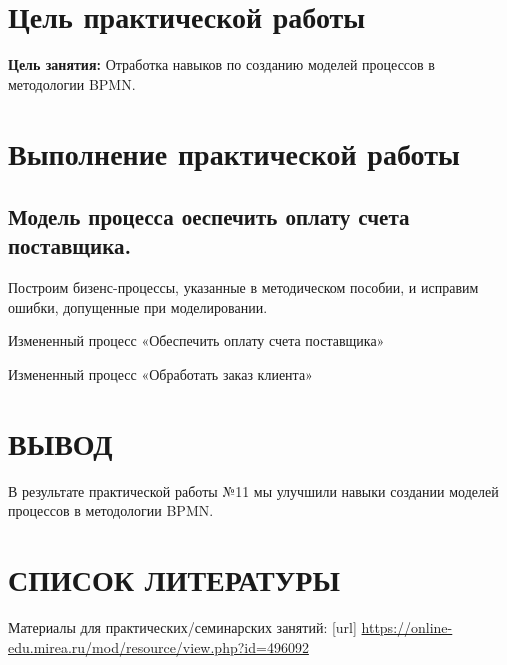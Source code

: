 \graphicspath{{./img/}}

\section{Цель практической работы}
\textbf{Цель занятия:}
Отработка навыков по созданию моделей процессов в методологии BPMN.

\clearpage

\section{Выполнение практической работы}
\subsection{Модель процесса оеспечить оплату счета поставщика.}
Построим бизенс-процессы, указанные в методическом пособии, и исправим ошибки, допущенные при моделировании.


\begin{image}
	\caption{Измененный процесс «Обеспечить оплату счета поставщика»}
\end{image}

\clearpage
\newpage

\begin{image}
	\caption{Измененный процесс «Обработать заказ клиента»}
\end{image}

\clearpage
\newpage

\section*{ВЫВОД}
В результате практической работы №11 мы улучшили навыки создании моделей процессов в методологии BPMN.

\clearpage

\section*{СПИСОК ЛИТЕРАТУРЫ}
\begin{thebibliography}{}
	\bibitem{}  Материалы для практических/семинарских занятий: [url]
	\url{https://online-edu.mirea.ru/mod/resource/view.php?id=496092}
\end{thebibliography}
